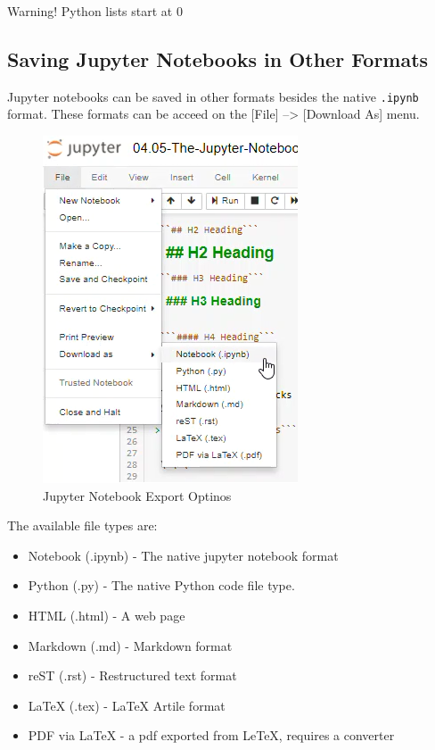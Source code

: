 \documentclass{book}
\makeatletter
\def\maxwidth{\ifdim\Gin@nat@width>\linewidth\linewidth
    \else\Gin@nat@width\fi}
\let\Oldincludegraphics\includegraphics
\renewcommand{\includegraphics}[1]{\Oldincludegraphics[width=.8\maxwidth]{#1}}
\providecommand{\tightlist}{%
      \setlength{\itemsep}{0pt}\setlength{\parskip}{0pt}}
\makeatother
\begin{document}
Warning! Python lists start at 0
    




    
        \subsection{Saving Jupyter Notebooks in Other
Formats}\label{saving-jupyter-notebooks-in-other-formats}

Jupyter notebooks can be saved in other formats besides the native
\lstinline!.ipynb! format. These formats can be acceed on the {[}File{]}
--\textgreater{} {[}Download As{]} menu.

\begin{figure}
\centering
\includegraphics{images/jupyter_notebook_export_options.png}
\caption{Jupyter Notebook Export Optinos}
\end{figure}

The available file types are:

\begin{itemize}
\tightlist
\item
  Notebook (.ipynb) - The native jupyter notebook format
\item
  Python (.py) - The native Python code file type.
\item
  HTML (.html) - A web page
\item
  Markdown (.md) - Markdown format
\item
  reST (.rst) - Restructured text format
\item
  LaTeX (.tex) - LaTeX Artile format
\item
  PDF via LaTeX - a pdf exported from LeTeX, requires a converter
\end{itemize}
\end{document}
